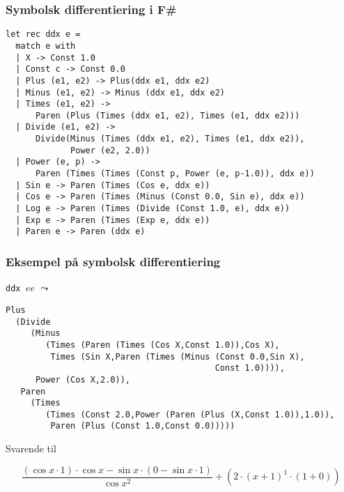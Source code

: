 \documentclass{beamer}
\begin{document}
\begin{frame}[fragile=singleslide]
\frametitle{Symbolsk differentiering i F\#}

{\small
\begin{verbatim}
let rec ddx e =
  match e with
  | X -> Const 1.0
  | Const c -> Const 0.0
  | Plus (e1, e2) -> Plus(ddx e1, ddx e2)
  | Minus (e1, e2) -> Minus (ddx e1, ddx e2)
  | Times (e1, e2) ->
      Paren (Plus (Times (ddx e1, e2), Times (e1, ddx e2)))
  | Divide (e1, e2) ->
      Divide(Minus (Times (ddx e1, e2), Times (e1, ddx e2)),
             Power (e2, 2.0))
  | Power (e, p) ->
      Paren (Times (Times (Const p, Power (e, p-1.0)), ddx e))
  | Sin e -> Paren (Times (Cos e, ddx e))
  | Cos e -> Paren (Times (Minus (Const 0.0, Sin e), ddx e))
  | Log e -> Paren (Times (Divide (Const 1.0, e), ddx e))
  | Exp e -> Paren (Times (Exp e, ddx e))
  | Paren e -> Paren (ddx e)
\end{verbatim}
}

\end{frame}

\begin{frame}[fragile=singleslide]
\frametitle{Eksempel på symbolsk differentiering}

\texttt{ddx $ee$} $\leadsto$

{\small
\begin{verbatim}
Plus
  (Divide
     (Minus
        (Times (Paren (Times (Cos X,Const 1.0)),Cos X),
         Times (Sin X,Paren (Times (Minus (Const 0.0,Sin X),
                                          Const 1.0)))),
      Power (Cos X,2.0)),
   Paren
     (Times
        (Times (Const 2.0,Power (Paren (Plus (X,Const 1.0)),1.0)),
         Paren (Plus (Const 1.0,Const 0.0)))))
\end{verbatim}
}


Svarende til

\[
\frac{(\cos x\cdot 1)\cdot \cos x-\sin x\cdot (0-\sin x\cdot 1)}{\cos x^2}+(2\cdot (x+1)^1\cdot (1+0))
\]

\end{frame}
\end{document}
